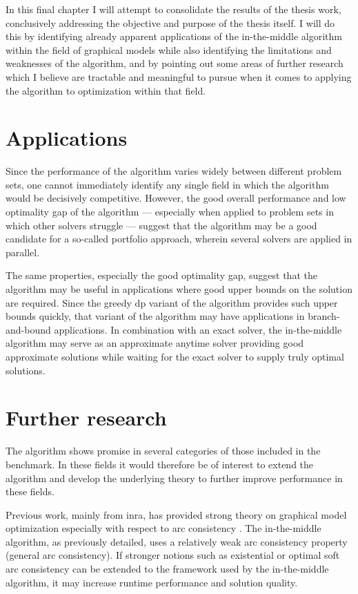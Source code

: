 In this final chapter I will attempt to consolidate the results of the thesis work, conclusively addressing the objective and purpose of the thesis itself.
I will do this by identifying already apparent applications of the in-the-middle algorithm within the field of graphical models while also identifying the limitations and weaknesses of the algorithm, and by pointing out some areas of further research which I believe are tractable and meaningful to pursue when it comes to applying the algorithm to optimization within that field.

\section{Applications}
Since the performance of the algorithm varies widely between different problem sets, one cannot immediately identify any single field in which the algorithm would be decisively competitive.
However, the good overall performance and low optimality gap of the algorithm --- especially when applied to problem sets in which other solvers struggle --- suggest that the algorithm may be a good candidate for a so-called portfolio approach, wherein several solvers are applied in parallel.

The same properties, especially the good optimality gap, suggest that the algorithm may be useful in applications where good upper bounds on the solution are required.
Since the greedy \gls{dp} variant of the algorithm provides such upper bounds quickly, that variant of the algorithm may have applications in branch-and-bound applications.
In combination with an exact solver, the in-the-middle algorithm may serve as an approximate anytime solver providing good approximate solutions while waiting for the exact solver to supply truly optimal solutions.

\section{Further research}
The algorithm shows promise in several categories of those included in the benchmark.
In these fields it would therefore be of interest to extend the algorithm and develop the underlying theory to further improve performance in these fields.

Previous work, mainly from \gls{inra}, has provided strong theory on graphical model optimization especially with respect to arc consistency \parencite{Cooper10,Cooper08,deGivry06,deGivry05}.
The in-the-middle algorithm, as previously detailed, uses a relatively weak arc consistency property (general arc consistency).
If stronger notions such as existential \parencite{deGivry05} or optimal soft \parencite{Cooper10} arc consistency can be extended to the framework used by the in-the-middle algorithm, it may increase runtime performance and solution quality.

